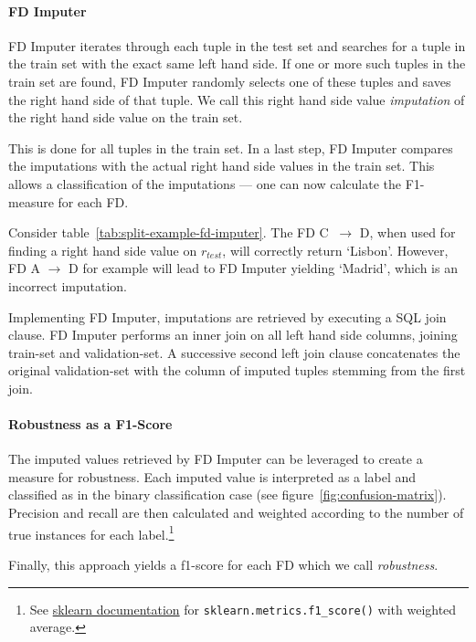 \paragraph{FD Imputer} FD Imputer iterates through each tuple in the test set and searches for a tuple in the train set with the exact same left hand side.
If one or more such tuples in the train set are found, FD Imputer randomly selects one of these tuples and saves the right hand side of that tuple.
We call this right hand side value \emph{imputation} of the right hand side value on the train set.

This is done for all tuples in the train set.
In a last step, FD Imputer compares the imputations with the actual right hand side values in the train set.
This allows a classification of the imputations --- one can now calculate the F1-measure for each FD.

Consider table~\ref{tab:split-example-fd-imputer}.
The FD \textsc{C} \( \ \to \) \textsc{D}, when used for finding a right hand side value on \( r_{test} \), will correctly return `Lisbon'.
However, FD \textsc{A} \( \to \) \textsc{D} for example will lead to FD Imputer yielding `Madrid', which is an incorrect imputation.

Implementing FD Imputer, imputations are retrieved by executing a SQL join clause.
FD Imputer performs an inner join on all left hand side columns, joining train-set and validation-set.
A successive second left join clause concatenates the original validation-set with the column of imputed tuples stemming from the first join.

\paragraph{Robustness as a F1-Score} The imputed values retrieved by FD Imputer can be leveraged to create a measure for robustness.
Each imputed value is interpreted as a label and classified as in the binary classification case (see figure~\ref{fig:confusion-matrix}).
Precision and recall are then calculated and weighted according to the number of true instances for each label.\footnote{See \href{https://scikit-learn.org/stable/modules/generated/sklearn.metrics.f1_score.html}{sklearn documentation} for \texttt{sklearn.metrics.f1\_score()} with weighted average.}

Finally, this approach yields a f1-score for each FD which we call \emph{robustness}.

\newpage


